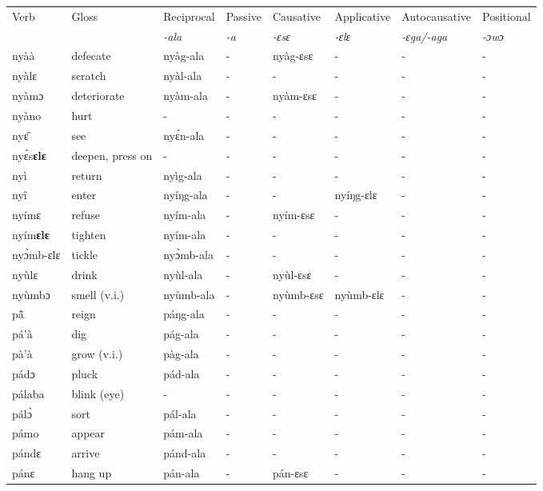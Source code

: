 \begin{sidewaystable}
\begin{tabular}{llllllll}
 \lsptoprule
 Verb & Gloss & Reciprocal & Passive  & Causative  & Applicative   & Autocausative & Positional   \\
  &    & {\itshape -ala} & {\itshape -a} & {\itshape -ɛsɛ} & {\itshape -ɛlɛ} & {\itshape -ɛga/-aga}  & {\itshape -ɔwɔ}  \\
\midrule
nyàà & defecate & nyàg-ala & - & nyàg-ɛsɛ  & - &  - & - \\
nyàlɛ & scratch & nyàl-ala & - & - & -  & - &  - \\
nyàmɔ & deteriorate & nyàm-ala & - & nyàm-ɛsɛ & - & - & - \\
nyàno & hurt & - & - & - & - & - & - \\
nyɛ̂ & see & nyɛ́n-ala & - & - & -  & - & - \\
nyɛ̀s{\bfseries ɛlɛ} & deepen, press on & - & - & - & - & - & - \\
nyì & return & nyìg-ala & - & - & - & - & - \\
nyî & enter & nyíŋg-ala & - & - &  nyíŋg-ɛlɛ & - & - \\
nyímɛ & refuse & nyím-ala & - & nyím-ɛsɛ & - &  - & - \\
nyím{\bfseries ɛlɛ} & tighten & nyím-ala & - & - & - & - & - \\
nyɔ̀mb-ɛlɛ & tickle & nyɔ̀mb-ala & - & - & - & - & - \\
nyùlɛ & drink & nyùl-ala & - & nyùl-ɛsɛ & - &  - &  - \\
nyùmbɔ & smell (v.i.) & nyùmb-ala & - & nyùmb-ɛsɛ & nyùmb-ɛlɛ & - & - \\
pã̂ &  reign & páŋg-ala & - & - & - & - & - \\
pá'à & dig & pág-ala & - & - & - & - & - \\
pà'à & grow (v.i.) & pàg-ala & - & - & - & - & - \\
pádɔ & pluck & pád-ala & - & - & - & - & - \\
pálaba & blink (eye)  & - & - & - & - & - & - \\
pálɔ̀ & sort & pál-ala & - & - & - & - & - \\
pámo & appear & pám-ala & - & - & - & - & - \\
pándɛ & arrive & pánd-ala & - & - & - & - & - \\
pánɛ & hang up & pán-ala &  - & pán-ɛsɛ & - &  - & -  \\
\midrule\end{tabular}\end{sidewaystable}

